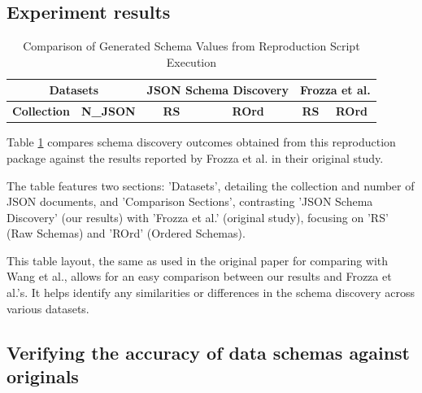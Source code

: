 \documentclass[sigconf, nonacm]{acmart}
\begin{document}
\subsection{Experiment results}

\begin{table}
\centering
\caption{Comparison of Generated Schema Values from Reproduction Script Execution} \label{results-table}
\scalebox{0.80} {
\begin{tabular}{|l|c|c|c|c|c|}
\hline
\multicolumn{2}{|c|}{\textbf{Datasets}} & \multicolumn{2}{c|}{\textbf{JSON Schema Discovery}} &
\multicolumn{2}{c|}{\textbf{Frozza et al. \cite{JsonSchemaDiscovery}}} \\
\hline
\textbf{Collection} & \textbf{N\_JSON} & \textbf{RS} & \textbf{ROrd} & \textbf{RS} & \textbf{ROrd} \\
\hline

\end{tabular}
}

\end{table}

Table \ref{results-table} compares schema discovery outcomes obtained from this reproduction package against the results reported by Frozza et al. in their original study.

The table features two sections: 'Datasets', detailing the collection and number of JSON documents, and 'Comparison Sections', contrasting 'JSON Schema Discovery' (our results) with 'Frozza et al.' (original study), focusing on 'RS' (Raw Schemas) and 'ROrd' (Ordered Schemas).

This table layout, the same as used in the original paper for comparing with Wang et al., allows for an easy comparison between our results and Frozza et al.'s. It helps identify any similarities or differences in the schema discovery across various datasets.


\subsection{Verifying the accuracy of data schemas against originals}
\end{document}
